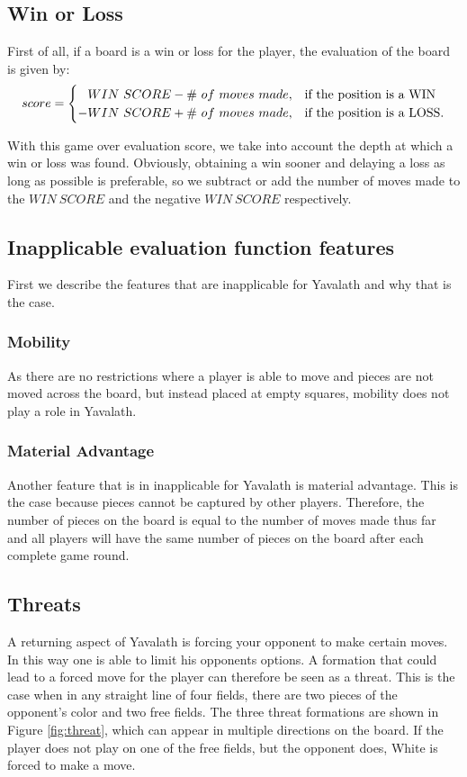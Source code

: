 \documentclass[11pt]{article}
\begin{document}
\subsection{Win or Loss}
\label{-subsec:winorloss}
First of all, if a board is a win or loss for the player, the evaluation of the board is given by:
\begin{equation}\label{eq:winscore}
score = \twopartdef{\phantom{-}WIN\ SCORE - \#\ of\ moves\ made}{\mbox{the position is a WIN}}{-WIN\ SCORE + \#\ of\ moves\ made}{\mbox{the position is a LOSS.}}
\end{equation}

With this game over evaluation score, we take into account the depth at which a win or loss was found. Obviously, obtaining a win sooner and delaying a loss as long as possible is preferable, so we subtract or add the number of moves made to the $WIN\ SCORE$ and the negative $WIN\ SCORE$ respectively.

\subsection{Inapplicable evaluation function features}
\label{-subsec:inapplicableevaluationfunctionfeatures}
First we describe the features that are inapplicable for Yavalath and why that is the case.

\subsubsection{Mobility}
\label{-subsubsec:mobility}
As there are no restrictions where a player is able to move and pieces are not moved across the board, but instead placed at empty squares, mobility does not play a role in Yavalath.

\subsubsection{Material Advantage}
\label{-subsubsec:materialadvantage}
Another feature that is in inapplicable for Yavalath is material advantage. This is the case because pieces cannot be captured by other players. Therefore, the number of pieces on the board is equal to the number of moves made thus far and all players will have the same number of pieces on the board after each complete game round.

\subsection{Threats}
\label{-subsec:threats}
A returning aspect of Yavalath is forcing your opponent to make certain moves. In this way one is able to limit his opponents options. A formation that could lead to a forced move for the player can therefore be seen as a threat. This is the case when in any straight line of four fields, there are two pieces of the opponent's color and two free fields. The three threat formations are shown in Figure \ref{fig:threat}, which can appear in multiple directions on the board. If the player does not play on one of the free fields, but the opponent does, White is forced to make a move.
\end{document}
